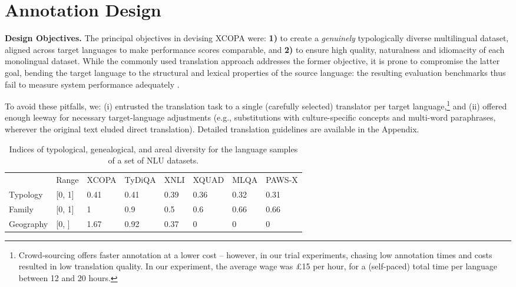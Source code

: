 \documentclass[11pt,a4paper]{article}
\newcommand{\ignore}[1]{}
\begin{document}
%
 
\section{Annotation Design}
\label{s:annotation}
\noindent \textbf{Design Objectives.}
The principal objectives in devising XCOPA were: \textbf{1)} to create a \emph{genuinely} typologically diverse multilingual dataset, aligned across target languages to make performance scores comparable, and \textbf{2)} to ensure high quality, naturalness and idiomacity of each monolingual dataset. While the commonly used translation approach addresses the former objective, 
it is prone to compromise the latter goal, bending the target language to the structural and lexical properties of the source language: the resulting evaluation benchmarks thus fail to 
measure system performance adequately \cite{koppel2011translationese,volansky2015features,artetxe2020translation,freitag2020bleu}.

To avoid these pitfalls, we: 
(i) entrusted the translation task to a single (carefully selected) translator per target language,\footnote{Crowd-sourcing offers faster annotation at a lower cost -- however, in our trial experiments, chasing low annotation times and costs resulted in low translation quality. In our experiment, the average wage was £15 per hour, for a (self-paced) total time per language between 12 and 20 hours.} and (ii) offered enough leeway for necessary target-language adjustments (e.g., substitutions with culture-specific concepts and multi-word paraphrases, wherever the original text eluded direct translation).\ignore{Allowing for language-specific modifications ensured that the output is natural and understandable to native speakers.} Detailed translation guidelines are available in the Appendix.



\begin{table*}[ht]
    \def\arraystretch{0.91}
    \centering
    {\small
    \begin{tabularx}{1.0\textwidth}{lY YYYYYY}
    \toprule
{} & Range & XCOPA & TyDiQA & XNLI & XQUAD & MLQA & PAWS-X \\
    \cmidrule(lr){3-8}
Typology & [0, 1] & {0.41} & {0.41} & 0.39 & 0.36 & 0.32 & 0.31 \\
Family & [0, 1] & {1} & 0.9 & 0.5  & 0.6 & 0.66 & 0.66 \\
Geography & [0, ] &  {1.67} & 0.92 & 0.37 & 0 & 0 & 0 \\

\bottomrule
    \end{tabularx}
    }\vspace{-1.5mm}
    \caption{Indices of typological, genealogical, and areal diversity for the language samples of a set of NLU datasets.}
    \label{tab:avgentropies}
    \vspace{-1.5mm}
\end{table*}
\end{document}
